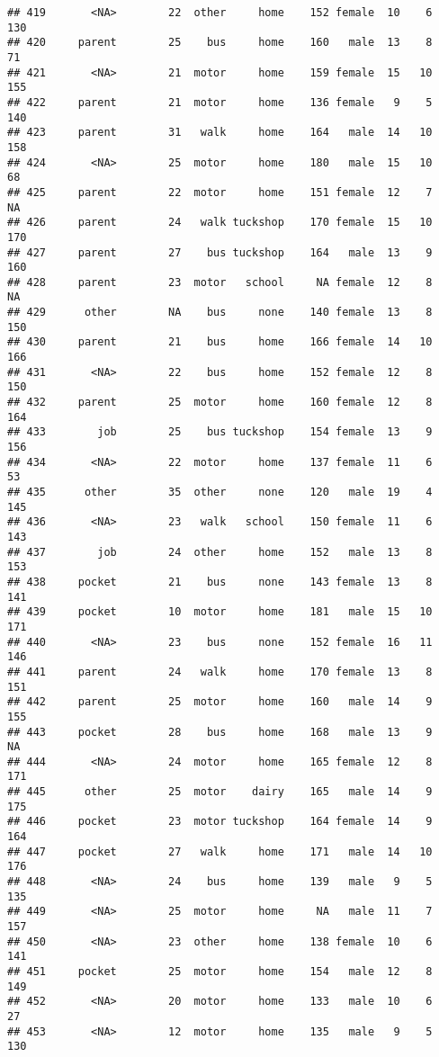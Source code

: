\documentclass[
]{article}
\begin{document}
\begin{verbatim}
## 419       <NA>        22  other     home    152 female  10    6     130
## 420     parent        25    bus     home    160   male  13    8      71
## 421       <NA>        21  motor     home    159 female  15   10     155
## 422     parent        21  motor     home    136 female   9    5     140
## 423     parent        31   walk     home    164   male  14   10     158
## 424       <NA>        25  motor     home    180   male  15   10      68
## 425     parent        22  motor     home    151 female  12    7      NA
## 426     parent        24   walk tuckshop    170 female  15   10     170
## 427     parent        27    bus tuckshop    164   male  13    9     160
## 428     parent        23  motor   school     NA female  12    8      NA
## 429      other        NA    bus     none    140 female  13    8     150
## 430     parent        21    bus     home    166 female  14   10     166
## 431       <NA>        22    bus     home    152 female  12    8     150
## 432     parent        25  motor     home    160 female  12    8     164
## 433        job        25    bus tuckshop    154 female  13    9     156
## 434       <NA>        22  motor     home    137 female  11    6      53
## 435      other        35  other     none    120   male  19    4     145
## 436       <NA>        23   walk   school    150 female  11    6     143
## 437        job        24  other     home    152   male  13    8     153
## 438     pocket        21    bus     none    143 female  13    8     141
## 439     pocket        10  motor     home    181   male  15   10     171
## 440       <NA>        23    bus     none    152 female  16   11     146
## 441     parent        24   walk     home    170 female  13    8     151
## 442     parent        25  motor     home    160   male  14    9     155
## 443     pocket        28    bus     home    168   male  13    9      NA
## 444       <NA>        24  motor     home    165 female  12    8     171
## 445      other        25  motor    dairy    165   male  14    9     175
## 446     pocket        23  motor tuckshop    164 female  14    9     164
## 447     pocket        27   walk     home    171   male  14   10     176
## 448       <NA>        24    bus     home    139   male   9    5     135
## 449       <NA>        25  motor     home     NA   male  11    7     157
## 450       <NA>        23  other     home    138 female  10    6     141
## 451     pocket        25  motor     home    154   male  12    8     149
## 452       <NA>        20  motor     home    133   male  10    6      27
## 453       <NA>        12  motor     home    135   male   9    5     130

\end{verbatim}
\end{document}
